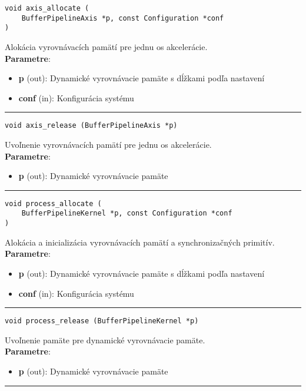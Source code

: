\begin{lstlisting}[style=docs]
void axis_allocate (
	BufferPipelineAxis *p, const Configuration *conf
)
\end{lstlisting}
   Alokácia vyrovnávacích pamätí pre jednu os akcelerácie. \\ 
\textbf{Parametre}:
\begin{itemize}[noitemsep, topsep=0pt]
	\item \textbf{p} (out): Dynamické vyrovnávacie pamäte s dĺžkami podľa nastavení
	\item \textbf{conf} (in): Konfigurácia systému  
\end{itemize}
\bigbreak
\hrule

\begin{lstlisting}[style=docs]
void axis_release (BufferPipelineAxis *p)
\end{lstlisting}
   Uvoľnenie vyrovnávacích pamätí pre jednu os akcelerácie. \\ 
\textbf{Parametre}:
\begin{itemize}[noitemsep, topsep=0pt]
	\item \textbf{p} (out): Dynamické vyrovnávacie pamäte
\end{itemize}
\bigbreak
\hrule

\begin{lstlisting}[style=docs]
void process_allocate (
	BufferPipelineKernel *p, const Configuration *conf
)
\end{lstlisting}
   Alokácia a inicializácia vyrovnávacích pamätí a synchronizačných primitív. \\ 
\textbf{Parametre}:
\begin{itemize}[noitemsep, topsep=0pt]
	\item \textbf{p} (out): Dynamické vyrovnávacie pamäte s dĺžkami podľa nastavení
	\item \textbf{conf} (in): Konfigurácia systému  
\end{itemize}
\bigbreak
\hrule

\begin{lstlisting}[style=docs]
void process_release (BufferPipelineKernel *p)
\end{lstlisting}
   Uvoľnenie pamäte pre dynamické vyrovnávacie pamäte. \\ 
\textbf{Parametre}:
\begin{itemize}[noitemsep, topsep=0pt]
	\item \textbf{p} (out): Dynamické vyrovnávacie pamäte
\end{itemize}
\bigbreak
\hrule

